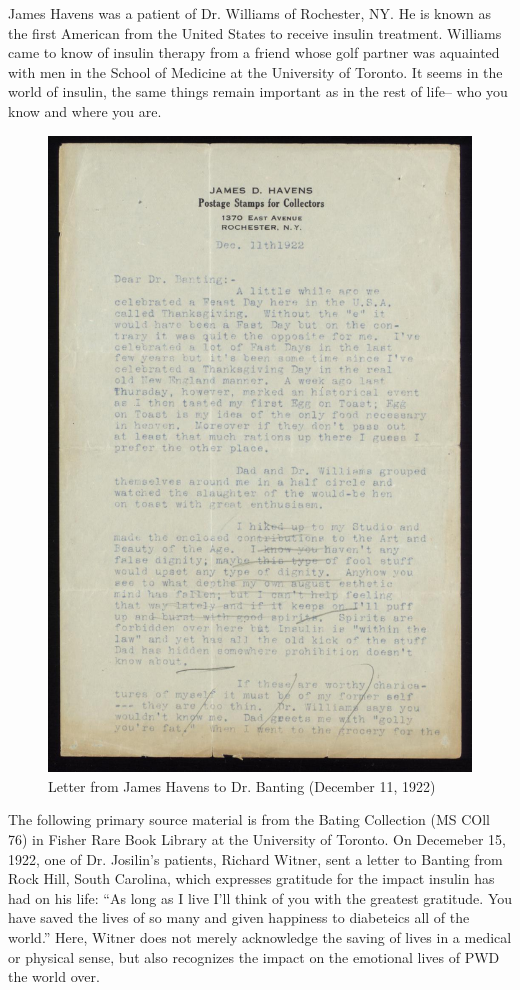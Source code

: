 \documentclass[12pt]{article}
\begin{document}
James Havens was a patient of Dr. Williams of Rochester, NY. He is known as the first American from the United States to receive insulin treatment. Williams came to know of insulin therapy from a friend whose golf partner was aquainted with men in the School of Medicine at the University of Toronto. It seems in the world of insulin, the same things remain important as in the rest of life-- who you know and where you are. 
\begin{figure}[H]
\centering
  \includegraphics [width=5in]{thanksgivinghavens}
  \caption{Letter from James Havens to Dr. Banting (December 11, 1922)}
  \label{fig: Thanksgiving Letter}
\end{figure}

The following primary source material is from the Bating Collection (MS COll 76) in Fisher Rare Book Library at the University of Toronto. 
On Decemeber 15, 1922, one of Dr. Josilin's patients, Richard Witner, sent a letter to Banting from Rock Hill, South Carolina, which expresses gratitude for the impact insulin has had on his life:
``As long as I live I'll think of you with the greatest gratitude. You have saved the lives of so many and given happiness to diabeteics all of the world.''
Here, Witner does not merely acknowledge the saving of lives in a medical or physical sense, but also recognizes the impact on the emotional lives of PWD the world over. 
\end{document}
